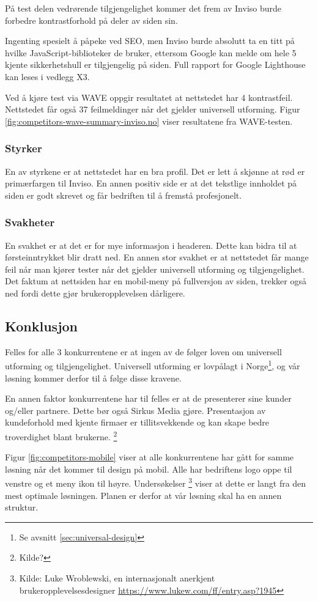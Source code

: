 På test delen vedrørende tilgjengelighet kommer det frem av Inviso burde forbedre kontrastforhold på deler av siden sin.

Ingenting spesielt å påpeke ved SEO, men Inviso burde absolutt ta en titt på hvilke JavaScript-biblioteker de bruker, ettersom Google kan melde om hele 5 kjente sikkerhetshull er tilgjengelig på siden. Full rapport for Google Lighthouse kan leses i vedlegg X3.

Ved å kjøre test via WAVE oppgir resultatet at nettstedet har 4 kontrastfeil. Nettstedet får også 37 feilmeldinger når det gjelder universell utforming. Figur \ref{fig:competitors-wave-summary-inviso.no} viser resultatene fra WAVE-testen.

\subsubsection{Styrker} 
En av styrkene er at nettstedet har en bra profil. Det er lett å skjønne at rød er primærfargen til Inviso. En annen positiv side er at det tekstlige innholdet på siden er godt skrevet og får bedriften til å fremstå profesjonelt.

\subsubsection{Svakheter}
En svakhet er at det er for mye informasjon i headeren. Dette kan bidra til at førsteinntrykket blir dratt ned. En annen stor svakhet er at nettstedet får mange feil når man kjører tester når det gjelder universell utforming og tilgjengelighet. Det faktum at nettsiden har en mobil-meny på fullversjon av siden, trekker også ned fordi dette gjør brukeropplevelsen dårligere.

\subsection{Konklusjon}
Felles for alle 3 konkurrentene er at ingen av de følger loven om universell utforming og tilgjengelighet. Universell utforming er lovpålagt i Norge\footnote{Se avsnitt \ref{sec:universal-design}}, og vår løsning kommer derfor til å følge disse kravene. 

En annen faktor konkurrentene har til felles er at de presenterer sine kunder og/eller partnere. Dette bør også Sirkus Media gjøre. Presentasjon av kundeforhold med kjente firmaer er tillitsvekkende og kan skape bedre troverdighet blant brukerne. \footnote{Kilde?}

Figur \ref{fig:competitors-mobile} viser at alle konkurrentene har gått for samme løsning når det kommer til design på mobil. Alle har bedriftens logo oppe til venstre og et meny ikon til høyre. Undersøkelser \footnote{Kilde: Luke Wroblewski, en internasjonalt anerkjent brukeropplevelsesdesigner \url{https://www.lukew.com/ff/entry.asp?1945}} viser at dette er langt fra den mest optimale løsningen. Planen er derfor at vår løsning skal ha en annen struktur.

